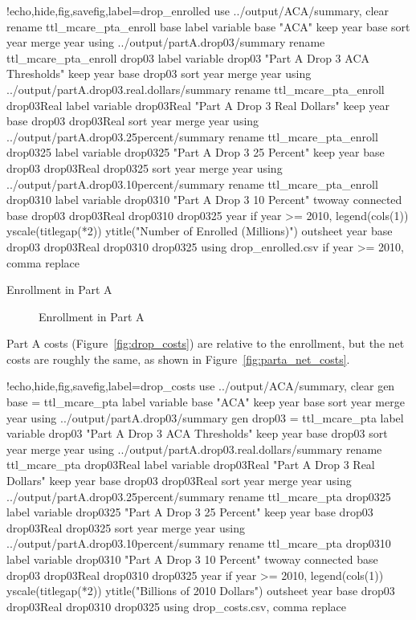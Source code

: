 \documentclass{article}
\begin{document}
\begin{Statacode}{!echo,hide,fig,savefig,label=drop_enrolled}
use ../output/ACA/summary, clear
rename ttl_mcare_pta_enroll base
label variable base "ACA"
keep year base
sort year
merge year using ../output/partA.drop03/summary
rename ttl_mcare_pta_enroll drop03
label variable drop03 "Part A Drop 3 ACA Thresholds"
keep year base drop03
sort year
merge year using ../output/partA.drop03.real.dollars/summary
rename ttl_mcare_pta_enroll drop03Real
label variable drop03Real "Part A Drop 3 Real Dollars"
keep year base drop03 drop03Real
sort year
merge year using ../output/partA.drop03.25percent/summary
rename ttl_mcare_pta_enroll drop0325
label variable drop0325 "Part A Drop 3 25 Percent"
keep year base drop03 drop03Real drop0325
sort year
merge year using ../output/partA.drop03.10percent/summary
rename ttl_mcare_pta_enroll drop0310
label variable drop0310 "Part A Drop 3 10 Percent"
twoway connected base drop03 drop03Real drop0310 drop0325 year if year >= 2010, legend(cols(1)) yscale(titlegap(*2)) ytitle("Number of Enrolled (Millions)")
outsheet year base drop03 drop03Real drop0310 drop0325 using drop_enrolled.csv if year >= 2010, comma replace
\end{Statacode}


\begin{table}[ht]
\centering
\caption{Enrollment in Part A}
\label{tab:parta_c_cost}
\end{table}

\begin{figure}[ht]
\centering
{}
\caption{Enrollment in Part A}
\label{fig:drop_enrolled}
\end{figure}

Part A costs (Figure~\ref{fig:drop_costs}) are relative to the enrollment, but the net costs are roughly the same, as shown in Figure~\ref{fig:parta_net_costs}.
\begin{Statacode}{!echo,hide,fig,savefig,label=drop_costs}
use ../output/ACA/summary, clear
gen base = ttl_mcare_pta
label variable base "ACA"
keep year base
sort year
merge year using ../output/partA.drop03/summary
gen drop03 = ttl_mcare_pta
label variable drop03 "Part A Drop 3 ACA Thresholds"
keep year base drop03
sort year
merge year using ../output/partA.drop03.real.dollars/summary
rename ttl_mcare_pta drop03Real
label variable drop03Real "Part A Drop 3 Real Dollars"
keep year base drop03 drop03Real
sort year
merge year using ../output/partA.drop03.25percent/summary
rename ttl_mcare_pta drop0325
label variable drop0325 "Part A Drop 3 25 Percent"
keep year base drop03 drop03Real drop0325
sort year
merge year using ../output/partA.drop03.10percent/summary
rename ttl_mcare_pta drop0310
label variable drop0310 "Part A Drop 3 10 Percent"
twoway connected base drop03 drop03Real drop0310 drop0325 year if year >= 2010, legend(cols(1)) yscale(titlegap(*2)) ytitle("Billions of 2010 Dollars")
outsheet year base drop03 drop03Real drop0310 drop0325 using drop_costs.csv, comma replace
\end{Statacode}
\end{document}
